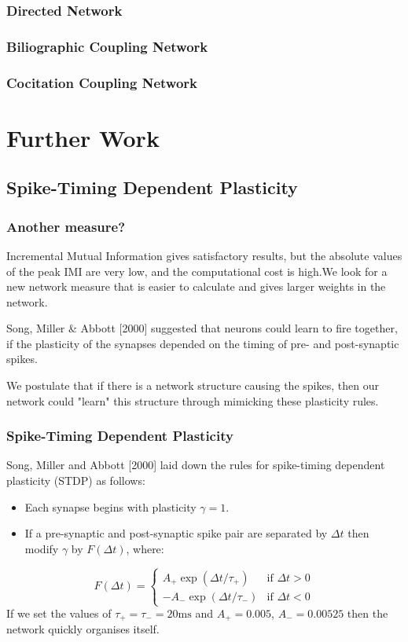 \documentclass{beamer}
\begin{document}
\frame
{
\frametitle{Directed Network}
\begin{center}
\end{center}
}
\frame
{
\frametitle{Biliographic Coupling Network}
\begin{center}
\end{center}
}

\frame
{
\frametitle{Cocitation Coupling Network}
\begin{center}
\end{center}
}
\section{Further Work}
\subsection{Spike-Timing Dependent Plasticity}
\frame
{
\frametitle{Another measure?}
Incremental Mutual Information gives satisfactory results, but the absolute values of the peak IMI are very low, and the computational cost is high.\pause We look for a new network measure that is easier to calculate and gives larger weights in the network.
\bigskip

\pause
Song, Miller \& Abbott [2000] suggested that neurons could learn to fire together, if the plasticity of the synapses depended on the timing of pre- and post-synaptic spikes.
\bigskip

\pause
We postulate that if there is a network structure causing the spikes, then our network could "learn" this structure through mimicking these plasticity rules.
}
\frame
{
\frametitle{Spike-Timing Dependent Plasticity}
Song, Miller and Abbott [2000] laid down the rules for spike-timing dependent plasticity (STDP) as follows:\pause
\begin{itemize}
\item<1-> Each synapse begins with plasticity $\gamma = 1$.
\pause
\item<2-> If a pre-synaptic and post-synaptic spike pair are separated by $\Delta t$ then modify $\gamma$ by $F(\Delta t)$, where:
\end{itemize}
$$
F(\Delta t) = \left\{ \begin{array}{ll} A_+ \exp (\Delta t / \tau_+) & \text{if } \Delta t>0 \\
-A_- \exp( \Delta t / \tau_-) & \text{if } \Delta t<0 \end{array} \right.
$$
\pause
If we set the values of $\tau_+=\tau_- = 20\text{ms}$ and $A_+=0.005$, $A_-=0.00525$ then the network quickly organises itself.
}
\end{document}
